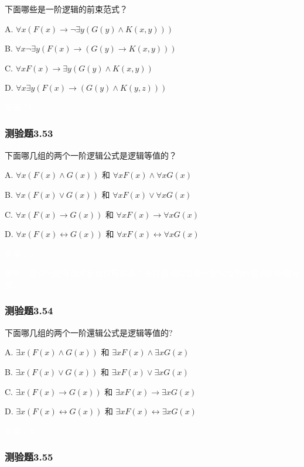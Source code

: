 \documentclass[UTF8, heading=true]{ctexart}
\begin{document}
下面哪些是一阶逻辑的前束范式？

A. $\forall x(F(x) \rightarrow \neg \exists y(G(y) \wedge K(x, y)))$

B. $\forall x \neg \exists y(F(x) \rightarrow(G(y) \rightarrow K(x, y)))$

C. $\forall x F(x) \rightarrow \exists y(G(y) \wedge K(x, y))$

D. $\forall x \exists y(F(x) \rightarrow(G(y) \wedge K(y, z)))$

\textcolor{white}{答案：D}

\subsubsection{测验题3.53}

下面哪几组的两个一阶逻辑公式是逻辑等值的？

A. $\forall x(F(x) \wedge G(x))$ 和 $\forall x F(x) \wedge \forall x G(x)$

B. $\forall x(F(x) \vee G(x))$ 和 $\forall x F(x) \vee \forall x G(x)$

C. $\forall x(F(x) \rightarrow G(x))$ 和 $\forall x F(x) \rightarrow \forall x G(x)$

D. $\forall x(F(x) \leftrightarrow G(x))$ 和 $\forall x F(x) \leftrightarrow \forall x G(x)$

\textcolor{white}{答案：A}

\textcolor{white}{解析：量词分配等值式有且仅有两条：全称量词的合取分配以及特称量词的析取分配。}

\subsubsection{测验题3.54}

下面哪几组的两个一阶還辑公式是逻辑等值的?

A. $\exists x(F(x) \wedge G(x))$ 和 $\exists x F(x) \wedge \exists x G(x)$

B.  $\exists x(F(x) \vee G(x))$ 和 $\exists x F(x) \vee \exists x G(x)$

C. $\exists x(F(x) \rightarrow G(x))$ 和 $\exists x F(x) \rightarrow \exists x G(x)$

D. $\exists x(F(x) \leftrightarrow G(x))$ 和 $\exists x F(x) \leftrightarrow \exists x G(x)$


\textcolor{white}{答案：B}

\subsubsection{测验题3.55}
\end{document}
